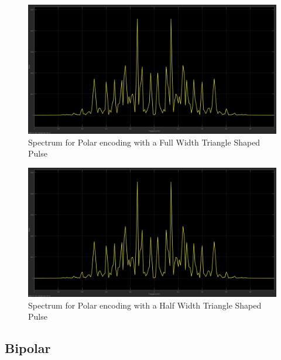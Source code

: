 \documentclass{article}
\begin{document}
\begin{figure}[H]
  \includegraphics[width = \linewidth]{Polar_Tri_F_Spectrum.jpg}
  \caption{Spectrum for Polar encoding with a Full Width Triangle Shaped Pulse}
  \label{fig:Polar-Tri-F-Spectrum}
\end{figure}
\begin{figure}[H]
  \includegraphics[width = \linewidth]{Polar_Tri_H_Spectrum.jpg}
  \caption{Spectrum for Polar encoding with a Half Width Triangle Shaped Pulse}
  \label{fig:Polar-Tri-H-Spectrum}
\end{figure}
\subsection{Bipolar}
\end{document}

